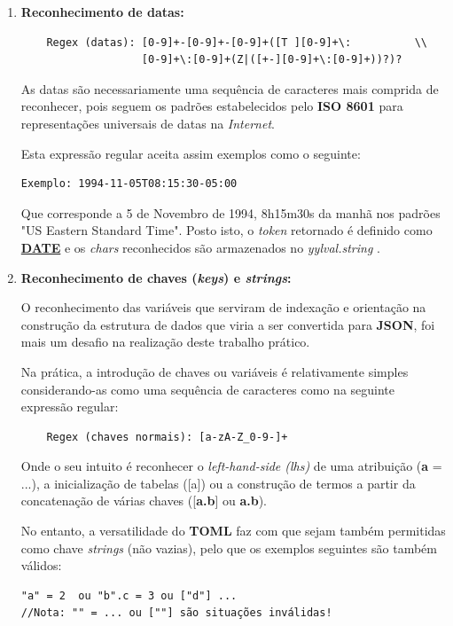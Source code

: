 \documentclass[a4paper,12pt]{report}
\begin{document}
\begin{enumerate}
    \item \textbf{Reconhecimento de datas:}
    
\begin{verbatim}
    Regex (datas): [0-9]+-[0-9]+-[0-9]+([T ][0-9]+\:          \\
                   [0-9]+\:[0-9]+(Z|([+-][0-9]+\:[0-9]+))?)?
\end{verbatim}

As datas são necessariamente uma sequência de caracteres mais comprida de reconhecer, pois seguem os padrões estabelecidos pelo \textbf{ISO 8601} para representações universais de datas na \textit{Internet}.\par
Esta expressão regular aceita assim exemplos como o seguinte:
\begin{verbatim}
Exemplo: 1994-11-05T08:15:30-05:00 
\end{verbatim}
Que corresponde a 5 de Novembro de 1994, 8h15m30s da manhã nos padrões "US Eastern Standard Time". Posto isto, o \textit{token} retornado é definido como \underline{\textbf{DATE}} e os \textit{chars} reconhecidos são armazenados no \textit{yylval.string} .

    \item \textbf{Reconhecimento de chaves (\textit{keys}) e \textit{strings}:}
    
O reconhecimento das variáveis que serviram de indexação e orientação na construção da estrutura de dados que viria a ser convertida para \textbf{JSON}, foi mais um desafio na realização deste trabalho prático.\par
Na prática, a introdução de chaves ou variáveis é relativamente simples considerando-as como uma sequência de caracteres como na seguinte expressão regular:

\begin{verbatim}
    Regex (chaves normais): [a-zA-Z_0-9-]+  
\end{verbatim}
\par
Onde o seu intuito é reconhecer o \textit{left-hand-side (lhs)} de uma atribuição (\textbf{a }= ...), a inicialização de tabelas ([a]) ou a construção de termos a partir da concatenação de várias chaves ([\textbf{a.b}] ou \textbf{a.b}). 
\par No entanto, a versatilidade do \textbf{TOML} faz com que sejam também permitidas como chave \textit{strings} (não vazias), pelo que os exemplos seguintes são também válidos:

\begin{verbatim}
"a" = 2  ou "b".c = 3 ou ["d"] ...
//Nota: "" = ... ou [""] são situações inválidas!
\end{verbatim}


\end{enumerate}
\end{document}
